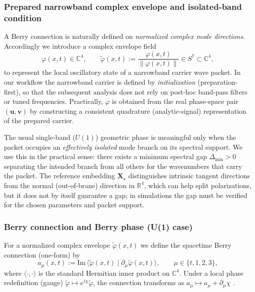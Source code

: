 \subsubsection{Prepared narrowband complex envelope and isolated-band condition}
A Berry connection is naturally defined on \emph{normalized complex mode directions}.
Accordingly we introduce a complex envelope field
\begin{equation}
  \varphi(x,t)\in\mathbb C^4,
  \qquad
  \tilde \varphi(x,t):=\frac{\varphi(x,t)}{\|\varphi(x,t)\|}\in S^7\subset\mathbb C^4,
  \label{eq:complex-envelope-normalized}
\end{equation}
to represent the local oscillatory state of a narrowband carrier wave packet.
In our workflow the narrowband carrier is defined by \emph{initialization} (preparation-first),
so that the subsequent analysis does not rely on post-hoc band-pass filters or tuned
frequencies. Practically, $\varphi$ is obtained from the real phase-space pair $(\mathbf u,\mathbf v)$
by constructing a consistent quadrature (analytic-signal) representation of the prepared carrier.

The usual single-band ($U(1)$) geometric phase is meaningful only when the packet occupies an
\emph{effectively isolated} mode branch on its spectral support. We use this in the practical sense:
there exists a minimum spectral gap $\Delta_{\min}>0$ separating the intended branch from all others
for the wavenumbers that carry the packet.
The reference embedding $\mathbf X_\star$ distinguishes intrinsic tangent directions from the
normal (out-of-brane) direction in $\mathbb R^4$, which can help split polarizations, but it does
not by itself guarantee a gap; in simulations the gap must be verified for the chosen parameters
and packet support.

\subsubsection{Berry connection and Berry phase (U(1) case)}
For a normalized complex envelope $\tilde \varphi(x,t)$ we define the spacetime Berry connection
(one-form) by
\begin{equation}
  a_\mu(x,t) := \mathrm{Im}\,\langle \tilde \varphi(x,t)\mid \partial_\mu \tilde \varphi(x,t)\rangle,
  \qquad \mu\in\{t,1,2,3\},
  \label{eq:spacetime-berry-connection}
\end{equation}
where $\langle\cdot,\cdot\rangle$ is the standard Hermitian inner product on $\mathbb C^4$.
Under a local phase redefinition (gauge) $\tilde \varphi\mapsto e^{i\chi}\tilde \varphi$, the connection transforms as
$a_\mu\mapsto a_\mu+\partial_\mu\chi$ \cite{Berry1984}.


